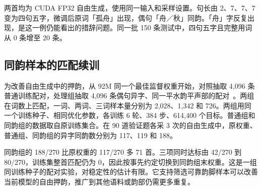 两首均为 CUDA FP32 自由生成，使用同一输入和采样设置。句长由 2、7、7、7 变为四句五字，微调后原词「孤舟」出现，偶句「舟／秋」同韵。「舟」字反复出现，是这一例仍能看出的措辞问题。同一批 150 条测试中，四句五字且完整用词从 0 条增至 20 条。

\subsection{同韵样本的匹配续训}

为改善自由生成中的押韵，从 92M 同一个最佳监督权重开始，对照抽取 4,096 条普通训练配对，处理组抽取 4,096 条偶句异字、同一平水韵平声部的配对~\cite{pingshui}。两组在词数上匹配，一词、两词、三词样本量分别为 2,028、1,342 和 726。两组用同一个训练种子、相同优化参数，各训练 6 轮、384 步、614,400 个目标。普通组和同韵组的数据取自原训练集合。在 90 道验证题各采 3 次的自由生成中，原权重、普通组、同韵组的异字同韵数分别为 117、119 和 188。


同韵组的 188/270 比原权重的 117/270 多 71 首。三项同时达标由 42/270 到 80/270，训练集整首匹配仍为 0，因此按事先约定切换到同韵组末权重。这是一组同训练种子的配对实验，对稳定性的估计有限。它支持筛选可靠韵脚样本可以改善当前模型的自由押韵，推广到其他语料或韵部仍需更多重复。
